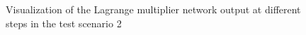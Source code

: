 \begin{figure}[h]
  \centering

  \vspace{0.2em}


  \caption{Visualization of the Lagrange multiplier network output at different steps in the test scenario 2}
  \label{chap4:fig:lagrange_test2}
\end{figure}